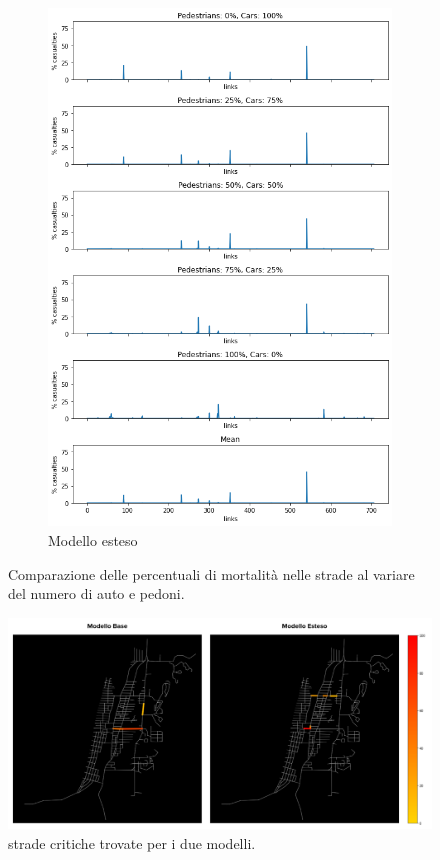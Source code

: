 \begin{figure}[p]
    \hfill
    \begin{subfigure}{0.475\textwidth}
        \centering
        \includegraphics[width=\textwidth]{images/analisi/new_links_casualties}
        \caption{Modello esteso}
        \label{fig:new-link-casualties}
    \end{subfigure}
    \caption{Comparazione delle percentuali di mortalità nelle strade al variare del numero di auto e pedoni.}
    \label{fig:analisi-comparison-critical-links1}
\end{figure}

\begin{figure}[p]
    \centering
    \includegraphics[width=\textwidth]{images/analisi/casualties-map.png}
    \caption{strade critiche trovate per i due modelli.}
    \label{fig:analisi-comparison-critical-links2}
\end{figure}

